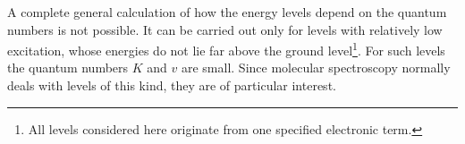 A complete general calculation of how the energy levels depend on the quantum numbers is not possible. It can be carried out only for levels with relatively low excitation, whose energies do not lie far above the ground level\footnote{All levels considered here originate from one specified electronic term.}. For such levels the quantum numbers $K$ and $v$ are small. Since molecular spectroscopy normally deals with levels of this kind, they are of particular interest.
